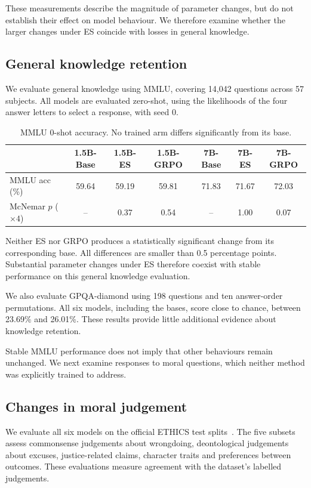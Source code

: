 \documentclass[10pt]{article}
\begin{document}
These measurements describe the magnitude of parameter changes, but do not establish their effect on model behaviour. We therefore examine whether the larger changes under ES coincide with losses in general knowledge.

\subsection{General knowledge retention}\label{sec:mmlu}
We evaluate general knowledge using MMLU, covering 14,042 questions across 57 subjects. All models are evaluated zero-shot, using the likelihoods of the four answer letters to select a response, with seed 0.

\begin{table}[H]\centering\small
\begin{tabular}{lcccccc}\toprule
 & 1.5B-Base & 1.5B-ES & 1.5B-GRPO & 7B-Base & 7B-ES & 7B-GRPO\\\midrule
MMLU acc (\%) & 59.64 & 59.19 & 59.81 & 71.83 & 71.67 & 72.03\\
McNemar $p$ ($\times4$) & -- & 0.37 & 0.54 & -- & 1.00 & 0.07\\\bottomrule
\end{tabular}
\caption{MMLU 0-shot accuracy. No trained arm differs significantly from its base.}\label{tab:mmlu}
\end{table}

Neither ES nor GRPO produces a statistically significant change from its corresponding base. All differences are smaller than 0.5 percentage points. Substantial parameter changes under ES therefore coexist with stable performance on this general knowledge evaluation.

We also evaluate GPQA-diamond using 198 questions and ten answer-order permutations. All six models, including the bases, score close to chance, between 23.69\% and 26.01\%. These results provide little additional evidence about knowledge retention.

Stable MMLU performance does not imply that other behaviours remain unchanged. We next examine responses to moral questions, which neither method was explicitly trained to address.

\subsection{Changes in moral judgement}\label{sec:ethics}
We evaluate all six models on the official ETHICS test splits~\cite{ethics}. The five subsets assess commonsense judgements about wrongdoing, deontological judgements about excuses, justice-related claims, character traits and preferences between outcomes. These evaluations measure agreement with the dataset's labelled judgements.
\end{document}
